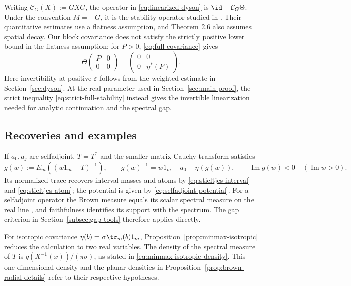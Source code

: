 \begin{remark}\label{rem:dyson-stability}
Writing $\mathcal C_G(X):=GXG$, the operator in \eqref{eq:linearized-dyson} is $\id-\mathcal C_G\Theta$.
Under the convention $M=-G$, it is the stability operator studied in \cite[Section 4.2, Proposition 4.4 and Theorem 2.6]{AEK19}.
Their quantitative estimates use a flatness assumption, and Theorem 2.6 also assumes spatial decay.
Our block covariance does not satisfy the strictly positive lower bound in the flatness assumption: for $P>0$, \eqref{eq:full-covariance} gives
\[
 \Theta\begin{pmatrix}P&0\\0&0\end{pmatrix}
       =\begin{pmatrix}0&0\\0&\eta^*(P)\end{pmatrix}.
\]
Here invertibility at positive $\varepsilon$ follows from the weighted estimate in Section~\ref{sec:dyson}.
At the real parameter used in Section~\ref{sec:main-proof}, the strict inequality \eqref{eq:strict-full-stability} instead gives the invertible linearization needed for analytic continuation and the spectral gap.
\end{remark}

\subsection{Recoveries and examples}
If $a_0,a_j$ are selfadjoint, $T=T^*$ and the smaller matrix Cauchy transform satisfies
\[
 g(w):=E_m((w1_m-T)^{-1}),\qquad
 g(w)^{-1}=w1_m-a_0-\eta(g(w)),\qquad
 \operatorname{Im}g(w)<0\quad(\operatorname{Im}w>0).
\]
Its normalized trace recovers interval masses and atoms by \eqref{eq:stieltjes-interval} and \eqref{eq:stieltjes-atom}; the potential is given by \eqref{eq:selfadjoint-potential}.
For a selfadjoint operator the Brown measure equals its scalar spectral measure on the real line \cite[Chapter 11, p.~270]{MS17}, and faithfulness identifies its support with the spectrum.
The gap criterion in Section~\ref{subsec:gap-tools} therefore applies directly.

For isotropic covariance $\eta(b)=\sigma\tr_m(b)1_m$, Proposition~\ref{prop:minmax-isotropic} reduces the calculation to two real variables.
The density of the spectral measure of $T$ is $q(X^{-1}(x))/(\pi\sigma)$, as stated in \eqref{eq:minmax-isotropic-density}.
This one-dimensional density and the planar densities in Proposition~\ref{prop:brown-radial-details} refer to their respective hypotheses.

